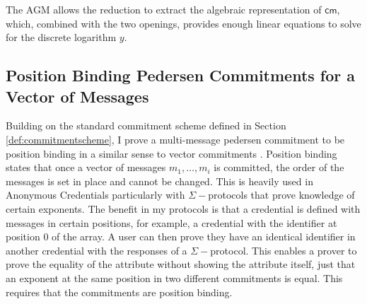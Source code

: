 The AGM allows the reduction to extract the algebraic representation of $\mathsf{cm}$, which, combined with the two openings, provides enough linear equations to solve for the discrete logarithm $y$. 









































































\subsection{Position Binding Pedersen Commitments for a Vector of Messages}

Building on the standard commitment scheme defined in Section \ref{def:commitmentscheme}, I prove a multi-message pedersen commitment to be position binding in a similar sense to vector commitments \cite{gorbunov_pointproofs_2020}. Position binding states that once a vector of messages $m_1, \ldots, m_i$ is committed, the order of the messages is set in place and cannot be changed. This is heavily used in Anonymous Credentials particularly with $\Sigma-$protocols that prove knowledge of certain exponents. The benefit in my protocols is that a credential is defined with messages in certain positions, for example, a credential with the identifier at position $0$ of the array. A user can then prove they have an identical identifier in another credential with the responses of a $\Sigma-$protocol. This enables a prover to prove the equality of the attribute without showing the attribute itself, just that an exponent at the same position in two different commitments is equal. This requires that the commitments are position binding. 


